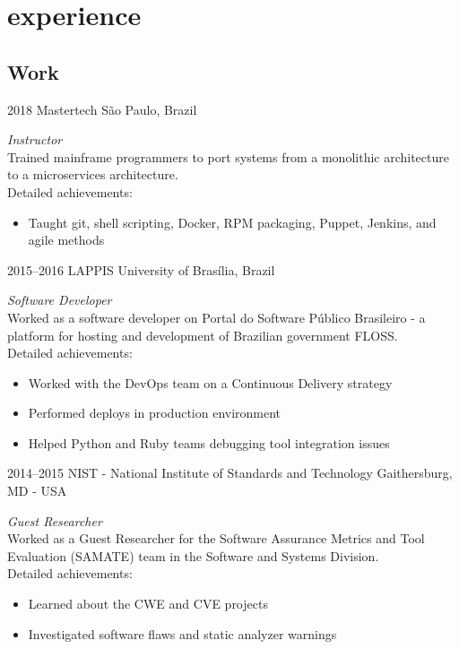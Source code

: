 \documentclass[print]{friggeri-cv}
\begin{document}

\section{experience}

\subsection{Work}

\begin{entrylist}

\entry
{2018}
{Mastertech}
{São Paulo, Brazil}
{\emph{Instructor} \\
  Trained mainframe programmers to port systems from a monolithic
  architecture to a microservices architecture. \\
Detailed achievements:
\begin{itemize}
  \item Taught git, shell scripting, Docker, RPM packaging, Puppet, Jenkins, and agile methods
\end{itemize}
}

\entry
{2015--2016}
{LAPPIS}
{University of Brasília, Brazil}
{\emph{Software Developer} \\
  Worked as a software developer on Portal do Software Público
  Brasileiro - a platform for hosting and development of Brazilian government
  FLOSS. \\
Detailed achievements:
\begin{itemize}
  \item Worked with the DevOps team on a Continuous Delivery strategy
  \item Performed deploys in production environment
  \item Helped Python and Ruby teams debugging tool integration issues
\end{itemize}
  }


\entry
{2014--2015}
{NIST - National Institute of Standards and Technology}
{Gaithersburg, MD - USA}
{\emph{Guest Researcher} \\
  Worked as a Guest Researcher for the Software Assurance Metrics and Tool
  Evaluation (SAMATE) team in the Software and Systems Division. \\ Detailed
  achievements:
\begin{itemize}
\item Learned about the CWE and CVE projects
\item Investigated software flaws and static analyzer warnings
\end{itemize}
  }


\end{entrylist}
\end{document}
